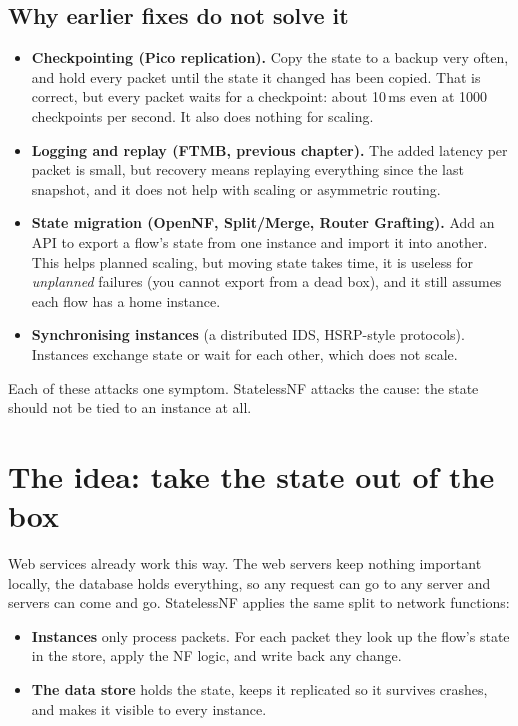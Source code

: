 \subsection{Why earlier fixes do not solve it}
\begin{itemize}
  \item \textbf{Checkpointing (Pico replication).} Copy the state to a backup very often, and hold every packet until the state it changed has
        been copied. That is correct, but every packet waits for a checkpoint: about 10\,ms even at 1000 checkpoints per second. It also does
        nothing for scaling.
  \item \textbf{Logging and replay (FTMB, previous chapter).} The added latency per packet is small, but recovery means replaying everything since the
        last snapshot, and it does not help with scaling or asymmetric routing.
  \item \textbf{State migration (OpenNF, Split/Merge, Router Grafting).} Add an API to export a flow's state from one instance and import it into
        another. This helps planned scaling, but moving state takes time, it is useless for \emph{unplanned} failures (you cannot export
        from a dead box), and it still assumes each flow has a home instance.
  \item \textbf{Synchronising instances} (a distributed IDS, HSRP-style protocols). Instances exchange state or wait for each other, which does not
        scale.
\end{itemize}
Each of these attacks one symptom. StatelessNF attacks the cause: the state should not be tied to an instance at all.

\section{The idea: take the state out of the box}


Web services already work this way. The web servers keep nothing important locally, the database holds everything, so any request
can go to any server and servers can come and go. StatelessNF applies the same split to network functions:
\begin{itemize}
  \item \textbf{Instances} only process packets. For each packet they look up the flow's state in the store, apply the NF logic, and
        write back any change.
  \item \textbf{The data store} holds the state, keeps it replicated so it survives crashes, and makes it visible to every instance.
\end{itemize}

